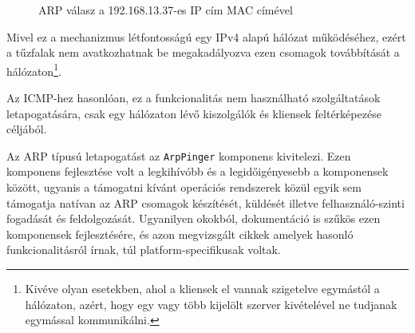 \documentclass[a4paper,12pt]{article}
\newcounter{subsubsubsection}[subsubsection]
\begin{document}
	\begin{figure}[!htbp]
		\centering
		\caption{ARP válasz a 192.168.13.37-es IP cím MAC címével}
		\label{arpresp}
	\end{figure}

	Mivel ez a mechanizmus létfontosságú egy IPv4 alapú hálózat működéséhez, ezért a tűzfalak nem avatkozhatnak be megakadályozva ezen csomagok továbbítását a hálózaton\footnote{Kivéve olyan esetekben, ahol a kliensek el vannak szigetelve egymástól a hálózaton, azért, hogy egy vagy több kijelölt szerver kivételével ne tudjanak egymással kommunikálni.}.
	
	Az ICMP-hez hasonlóan, ez a funkcionalitás nem használható szolgáltatások letapogatására, csak egy hálózaton lévő kiszolgálók és kliensek feltérképezése céljából.
	

	Az ARP típusú letapogatást az \texttt{ArpPinger} komponens kivitelezi. Ezen komponens fejlesztése volt a legkihívóbb és a legidőigényesebb a komponensek között, ugyanis a támogatni kívánt operációs rendszerek közül egyik sem támogatja natívan az ARP csomagok készítését, küldését illetve felhasználó-szinti fogadását és feldolgozását. Ugyanilyen okokból, dokumentáció is szűkös ezen komponensek fejlesztésére, és azon megvizsgált cikkek amelyek hasonló funkcionalitásról írnak, túl platform-specifikusak voltak.
	
\end{document}
